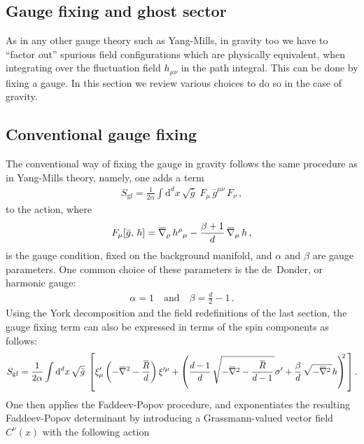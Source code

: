 \documentclass[11pt]{book}
\newcommand{\overbar}[1]{\mkern 1.5mu\overline{\mkern-1.5mu#1\mkern-1.5mu}\mkern 1.5mu}
\newcommand{\bnabla}{\overbar \nabla}
\newcommand{\bR}{\overbar R}
\numberwithin{equation}{chapter}
\begin{document}
\begin{appendices}
\section{Gauge fixing and ghost sector}

As in any other gauge theory such as Yang-Mills, in gravity too we have
to ``factor out'' spurious field configurations which are
physically equivalent, when integrating over the fluctuation field
$h_{\mu\nu}$ in the path integral. This can be done by fixing
a gauge. In this section we review various choices to do so
in the case of gravity.

\subsection{Conventional gauge fixing}

The conventional way of fixing the gauge in gravity follows the
same procedure as in Yang-Mills theory, namely, one adds a term
\begin{align}
  S_{\mathrm{gf}} = \frac{1}{2\alpha} \int \mathrm d^dx \, \sqrt{\bar g} \;
  F_\mu \, \bar g^{\mu\nu} \, F_\nu \,,
\end{align}
to the action, where
\begin{align}
  F_\mu[\bar g, \, h] = \bnabla_\rho \,  h^\rho{}_\mu - \frac{\beta+1}{d} \, \bnabla_\mu \, h \,,
\end{align}
is the gauge condition, fixed on the background manifold,
and $\alpha$ and $\beta$ are gauge parameters. One common choice of
these parameters is the de~Donder, or harmonic gauge:
\begin{align}
  \alpha = 1 \quad \text{and} \quad \beta = \frac d2 - 1 \,.
\end{align}
Using the York decomposition and the field redefinitions of the last section,
the gauge fixing term can also be expressed in terms of the spin components
as follows:
\begin{align}
  S_{\mathrm{gf}} = \frac{1}{2\alpha} \int \mathrm d^dx \, \sqrt{\bar g} \;
  \left[
    \xi'_\mu \left( -\bnabla^2 -\frac{\bR}{d} \right) \xi^{\prime\mu}
    +
    \left(
      \frac{d-1}{d} \, \sqrt{ -\bnabla^2 - \frac{\bR}{d-1} \, } \sigma'
      + \frac{\beta}{d} \, \sqrt{ -\bnabla^2 \, } h
    \right)^{\!\!\! 2} \,
  \right] .
\end{align}
One then applies the Faddeev-Popov procedure, and exponentiates the resulting Faddeev-Popov determinant
by introducing a Grassmann-valued vector field $C^{\nu}(x)$ with the following action
\begin{align}

\end{align}
\end{appendices}
\end{document}
